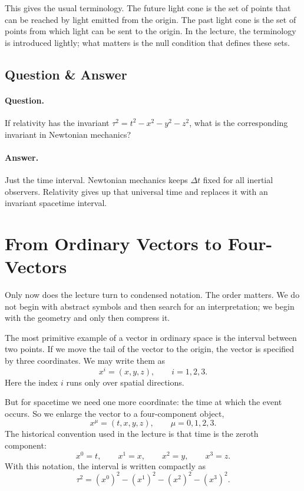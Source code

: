This gives the usual terminology. The future light cone is the set of points that can be reached by light emitted from the origin. The past light cone is the set of points from which light can be sent to the origin. In the lecture, the terminology is introduced lightly; what matters is the null condition that defines these sets.

\subsection{Question \& Answer}

\paragraph{Question.} If relativity has the invariant \(\tau^2=t^2-x^2-y^2-z^2\), what is the corresponding invariant in Newtonian mechanics?

\paragraph{Answer.} Just the time interval. Newtonian mechanics keeps \(\Delta t\) fixed for all inertial observers. Relativity gives up that universal time and replaces it with an invariant spacetime interval.

\section{From Ordinary Vectors to Four-Vectors}

Only now does the lecture turn to condensed notation. The order matters. We do not begin with abstract symbols and then search for an interpretation; we begin with the geometry and only then compress it.

The most primitive example of a vector in ordinary space is the interval between two points. If we move the tail of the vector to the origin, the vector is specified by three coordinates. We may write them as
\begin{equation}
x^i=(x,y,z),
\qquad i=1,2,3.
\end{equation}
Here the index \(i\) runs only over spatial directions.

But for spacetime we need one more coordinate: the time at which the event occurs. So we enlarge the vector to a four-component object,
\begin{equation}
x^\mu=(t,x,y,z),
\qquad \mu=0,1,2,3.
\end{equation}
The historical convention used in the lecture is that time is the zeroth component:
\begin{equation}
x^0=t,
\qquad
x^1=x,
\qquad
x^2=y,
\qquad
x^3=z.
\end{equation}
With this notation, the interval is written compactly as
\begin{equation}
\tau^2=(x^0)^2-(x^1)^2-(x^2)^2-(x^3)^2.
\end{equation}


